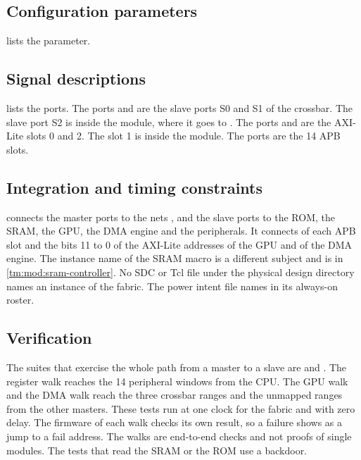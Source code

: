 \subsection{Configuration parameters}
 lists the parameter.



\subsection{Signal descriptions}
 lists the ports. The ports  and  are the slave ports S0 and S1 of the crossbar. The slave port S2 is inside the module, where it goes to . The ports  and  are the AXI-Lite slots 0 and 2. The slot 1 is inside the module. The ports  are the 14 APB slots.



\subsection{Integration and timing constraints}
 connects the master ports to the nets , and the slave ports to the ROM, the SRAM, the GPU, the DMA engine and the peripherals. It connects  of each APB slot and the bits 11 to 0 of the AXI-Lite addresses of the GPU and of the DMA engine. The instance name of the SRAM macro is a different subject and is in \cref{tm:mod:sram-controller}. No SDC or Tcl file under the physical design directory names an instance of the fabric. The power intent file names  in its always-on roster.

\subsection{Verification}
The suites that exercise the whole path from a master to a slave are  and . The register walk reaches the 14 peripheral windows from the CPU. The GPU walk and the DMA walk reach the three crossbar ranges and the unmapped ranges from the other masters. These tests run at one clock for the fabric and with zero delay. The firmware of each walk checks its own result, so a failure shows as a jump to a fail address. The walks are end-to-end checks and not proofs of single modules. The tests that read the SRAM or the ROM use a backdoor.

